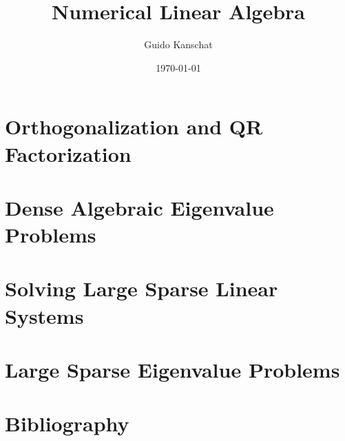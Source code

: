 \documentclass[notheorems,hidelinks,aspectratio=1610]{beamer}
\title{Numerical Linear Algebra}
\author{Guido Kanschat}
\date{\today}
\begin{document}
\frame{\maketitle}

\section{Orthogonalization and QR Factorization}


\section{Dense Algebraic Eigenvalue Problems}
\frame{\sectoc}





\section{Solving Large Sparse Linear Systems}
\frame{\sectoc}








\section{Large Sparse Eigenvalue Problems}
\frame{\sectoc}







\section*{Bibliography}
\frame{
}

\end{document}
